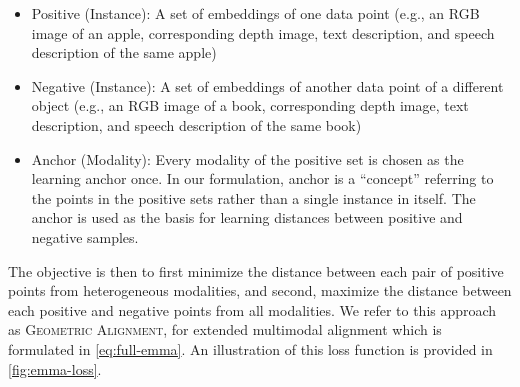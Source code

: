 \documentclass[10pt]{article} %
\newcommand{\todokd}[1]{\todo[color=red!20]{{\small #1 -- Kasra}}}
\newcommand{\geom}{\textsc{Geometric Alignment}}
\newcommand{\supcon}{\textsc{SupCon}}
\begin{document}
\begin{itemize}
    \item Positive (Instance): A set of embeddings of one data point (e.g., an RGB image of an apple, corresponding depth image, text description, and speech description of the same apple)
    \item Negative (Instance): A set of embeddings of another data point of a different object (e.g., an RGB image of a book, corresponding depth image, text description, and speech description of the same book)
    \item Anchor (Modality): Every modality of the positive set is chosen as the learning anchor once. In our formulation, anchor is a ``concept'' referring to the points in the positive sets rather than a single instance in itself.
    The anchor is used as the basis for learning distances between positive and negative samples.
\end{itemize}

The objective is then to first minimize the distance between each pair of positive points from heterogeneous modalities, and second, maximize the distance between each positive and negative points from all modalities.
We refer to this approach as \geom{}, for extended multimodal alignment which is formulated in \cref{eq:full-emma}. An illustration of this loss function is provided in \cref{fig:emma-loss}.
\end{document}
